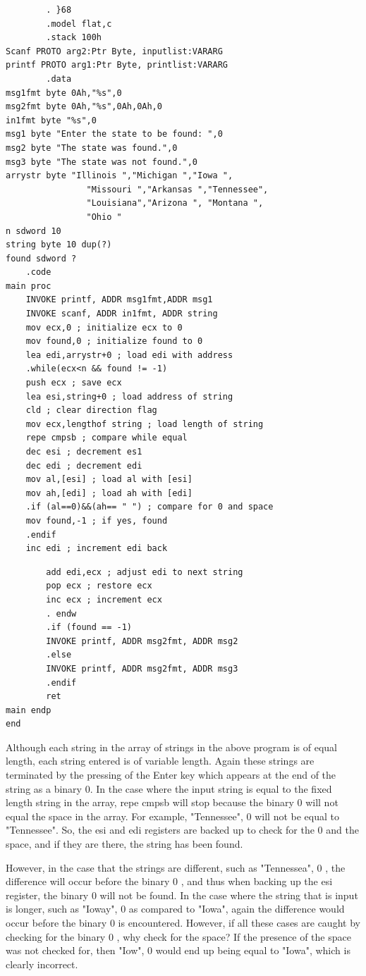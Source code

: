 \documentclass[10pt]{article}
\begin{document}
\begin{verbatim}
        . }68
        .model flat,c
        .stack 100h
Scanf PROTO arg2:Ptr Byte, inputlist:VARARG
printf PROTO arg1:Ptr Byte, printlist:VARARG
        .data
msg1fmt byte 0Ah,"%s",0
msg2fmt byte 0Ah,"%s",0Ah,0Ah,0
in1fmt byte "%s",0
msg1 byte "Enter the state to be found: ",0
msg2 byte "The state was found.",0
msg3 byte "The state was not found.",0
arrystr byte "Illinois ","Michigan ","Iowa ",
                "Missouri ","Arkansas ","Tennessee",
                "Louisiana","Arizona ", "Montana ",
                "Ohio "
n sdword 10
string byte 10 dup(?)
found sdword ?
    .code
main proc
    INVOKE printf, ADDR msg1fmt,ADDR msg1
    INVOKE scanf, ADDR in1fmt, ADDR string
    mov ecx,0 ; initialize ecx to 0
    mov found,0 ; initialize found to 0
    lea edi,arrystr+0 ; load edi with address
    .while(ecx<n && found != -1)
    push ecx ; save ecx
    lea esi,string+0 ; load address of string
    cld ; clear direction flag
    mov ecx,lengthof string ; load length of string
    repe cmpsb ; compare while equal
    dec esi ; decrement es1
    dec edi ; decrement edi
    mov al,[esi] ; load al with [esi]
    mov ah,[edi] ; load ah with [edi]
    .if (al==0)&&(ah== " ") ; compare for 0 and space
    mov found,-1 ; if yes, found
    .endif
    inc edi ; increment edi back
\end{verbatim}

\begin{verbatim}
        add edi,ecx ; adjust edi to next string
        pop ecx ; restore ecx
        inc ecx ; increment ecx
        . endw
        .if (found == -1)
        INVOKE printf, ADDR msg2fmt, ADDR msg2
        .else
        INVOKE printf, ADDR msg2fmt, ADDR msg3
        .endif
        ret
main endp
end
\end{verbatim}

Although each string in the array of strings in the above program is of equal length, each string entered is of variable length. Again these strings are terminated by the pressing of the Enter key which appears at the end of the string as a binary 0. In the case where the input string is equal to the fixed length string in the array, repe cmpsb will stop because the binary 0 will not equal the space in the array. For example, "Tennessee", 0 will not be equal to "Tennessee". So, the esi and edi registers are backed up to check for the 0 and the space, and if they are there, the string has been found.

However, in the case that the strings are different, such as "Tennessea", 0 , the difference will occur before the binary 0 , and thus when backing up the esi register, the binary 0 will not be found. In the case where the string that is input is longer, such as "Ioway", 0 as compared to "Iowa", again the difference would occur before the binary 0 is encountered. However, if all these cases are caught by checking for the binary 0 , why check for the space? If the presence of the space was not checked for, then "Iow", 0 would end up being equal to "Iowa", which is clearly incorrect.
\end{document}
